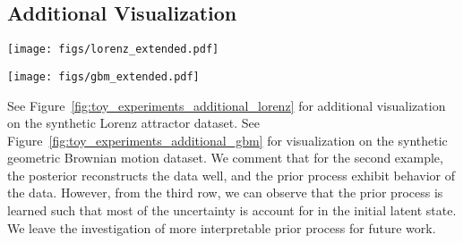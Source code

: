 \documentclass[twoside]{article}
\begin{document}
 \subsection{Additional Visualization}\label{app:visualization}

\begin{figure*}[ht]
\begin{minipage}[ht]{\linewidth}
\centering
{\texttt{[image: figs/lorenz\_extended.pdf]}} \\ \vspace{-0.10cm}
\end{minipage}
\caption{
Additional visualizations of learned posterior and prior dynamics on the synthetic stochastic Lorenz attractor dataset.
First row displays the true data and posterior reconstructions. 
Second row displays samples with initial latent state for each trajectory is sampled independently. 
Third row displays samples with initial latent state sampled and fixed to be the same for different trajectories. 
}
\label{fig:toy_experiments_additional_lorenz}
\end{figure*}

\begin{figure*}[ht]
\begin{minipage}[ht]{\linewidth}
\centering
{\texttt{[image: figs/gbm\_extended.pdf]}} \\ \vspace{-0.10cm}
\end{minipage}
\caption{
Visualizations of learned posterior and prior dynamics on the synthetic geometric Brownian motion dataset.
First row displays the true data and posterior reconstructions. Orange contour covers $95\%$ of 512 samples.
Second row displays samples with initial latent state for each trajectory is sampled independently. 
Third row displays samples with initial latent state sampled and fixed to be the same for different trajectories. 
}
\label{fig:toy_experiments_additional_gbm}
\end{figure*}

See Figure~\ref{fig:toy_experiments_additional_lorenz} for additional visualization on the synthetic Lorenz attractor dataset.
See Figure~\ref{fig:toy_experiments_additional_gbm} for visualization on the synthetic geometric Brownian motion dataset.
We comment that for the second example, the posterior reconstructs the data well, and the prior process exhibit behavior of the data. However, from the third row, we can observe that the prior process is learned such that most of the uncertainty is account for in the initial latent state. We leave the investigation of more interpretable prior process for future work. 
 
\end{document}
